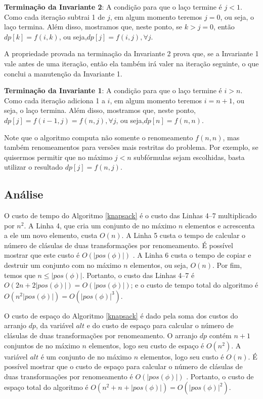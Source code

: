 \textbf{Terminação da Invariante 2}: A condição para que o laço termine é $j < 1$. Como cada iteração subtrai 1 de $j$, em algum momento teremos $j = 0$, ou seja, o laço termina. Além disso, mostramos que, neste ponto, se $k > j = 0$, então $dp[k] = f(i,k)$, ou seja,\break $dp[j] = f(i,j), \forall j$.

A propriedade provada na terminação da Invariante 2 prova que, se a Invariante 1 vale antes de uma iteração, então ela também irá valer na iteração seguinte, o que conclui a manutenção da Invariante 1.

\textbf{Terminação da Invariante 1}: A condição para que o laço termine é $i > n$. Como cada iteração adiciona 1 a $i$, em algum momento teremos $i = n+1$, ou seja, o laço termina. Além disso, mostramos que, neste ponto, $dp[j] = f(i-1,j) = f(n,j), \forall j$, ou seja,\break $dp[n] = f(n,n)$.

Note que o algoritmo computa não somente o renomeamento $f(n,n)$, mas também renomeamentos para versões mais restritas do problema. Por exemplo, se quisermos permitir que no máximo $j < n$ subfórmulas sejam escolhidas, basta utilizar o resultado $dp[j] = f(n,j)$.

\subsection{Análise}

\indent

O custo de tempo do Algoritmo \ref{knapsack} é o custo das Linhas 4--7 multiplicado por $n^2$. A Linha 4, que cria um conjunto de no máximo $n$ elementos e acrescenta a ele um novo elemento, custa $O(n)$. A Linha 5 custa o tempo de calcular o número de clásulas de duas transformações por renomeamento. É possível mostrar que este custo é $O(|pos(\phi)|)$ \cite{nonnengart2001computing}. A Linha 6 custa o tempo de copiar e destruir um conjunto com no máximo $n$ elementos, ou seja, $O(n)$. Por fim, temos que $n \leq |pos(\phi)|$. Portanto, o custo das Linhas 4--7 é $O(2n + 2|pos(\phi)|) = O(|pos(\phi)|)$; e o custo de tempo total do algoritmo é $O(n^2 |pos(\phi)|) = O(|pos(\phi)|^3)$.

O custo de espaço do Algoritmo \ref{knapsack} é dado pela soma dos custos do arranjo $dp$, da variável $alt$ e do custo de espaço para calcular o número de clásulas de duas transformações por renomeamento. O arranjo $dp$ contém $n+1$ conjuntos de no máximo $n$ elementos, logo seu custo de espaço é $O(n^2)$. A variável $alt$ é um conjunto de no máximo $n$ elementos, logo seu custo é $O(n)$. É possível mostrar que o custo de espaço para calcular o número de clásulas de duas transformações por renomeamento é $O(|pos(\phi)|)$ \cite{nonnengart2001computing}. Portanto, o custo de espaço total do algoritmo é $O(n^2 + n + |pos(\phi)|) = O(|pos(\phi)|^2)$.

